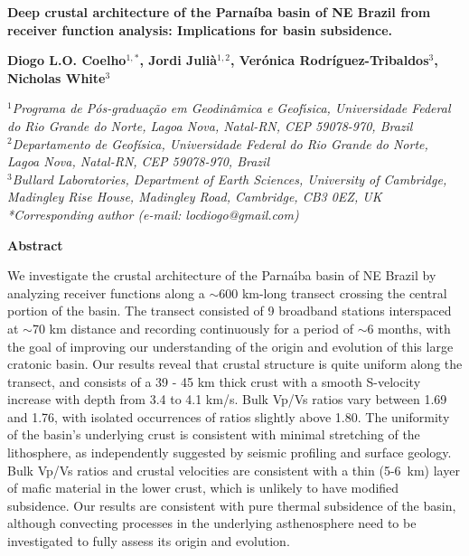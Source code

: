 \documentclass[manuscript,11pt]{geophysics}
\begin{document}
\begin{center}
\textbf{\LARGE
Deep crustal architecture of the Parnaíba basin of NE Brazil from receiver function analysis: Implications for basin subsidence.}

\textbf{Diogo L.O. Coelho$^{1,*}$, Jordi Julià$^{1,2}$, Verónica Rodríguez-Tribaldos$^{3}$, Nicholas White$^{3}$}

\textit{
$^{1}$Programa de P\'os-gradua\c{c}\~ao em Geodin\^amica e Geof\'{\i}sica, Universidade Federal do Rio Grande do Norte, Lagoa Nova, Natal-RN, CEP 59078-970, Brazil
\\
$^{2}$Departamento de Geofísica, Universidade Federal do Rio Grande do Norte, Lagoa Nova, Natal-RN, CEP 59078-970, Brazil
\\
$^{3}$Bullard Laboratories, Department of Earth Sciences, University of Cambridge, Madingley Rise House, Madingley Road, Cambridge, CB3 0EZ, UK
\\
*Corresponding author (e-mail: locdiogo@gmail.com)
}

\end{center}
 
\begin{flushleft}
\textbf{\LARGE Abstract}
\end{flushleft}

We investigate the crustal architecture of the Parna\'{\i}ba basin of NE Brazil by analyzing receiver functions along a $\sim$600 km-long transect crossing the central portion of the basin. The transect consisted of 9 broadband stations interspaced at $\sim$70 km distance and recording continuously for a period of $\sim$6 months, with the goal of improving our understanding of the origin and evolution of this large cratonic basin. Our results reveal that crustal structure is quite uniform along the transect, and consists of a 39 - 45 km thick crust with a smooth S-velocity increase with depth from 3.4 to 4.1 km/s. Bulk Vp/Vs ratios vary between 1.69 and 1.76, with isolated occurrences of ratios slightly above 1.80. The uniformity of the basin's underlying crust is consistent with minimal stretching of the lithosphere, as independently suggested by seismic profiling and surface geology. Bulk Vp/Vs ratios and crustal velocities are consistent with a thin (5-6~km) layer of mafic material in the lower crust, which is unlikely to have modified subsidence. Our results are consistent with pure thermal subsidence of the basin, although convecting processes in the underlying asthenosphere need to be investigated to fully assess its origin and evolution.
\linebreak 
\end{document}
